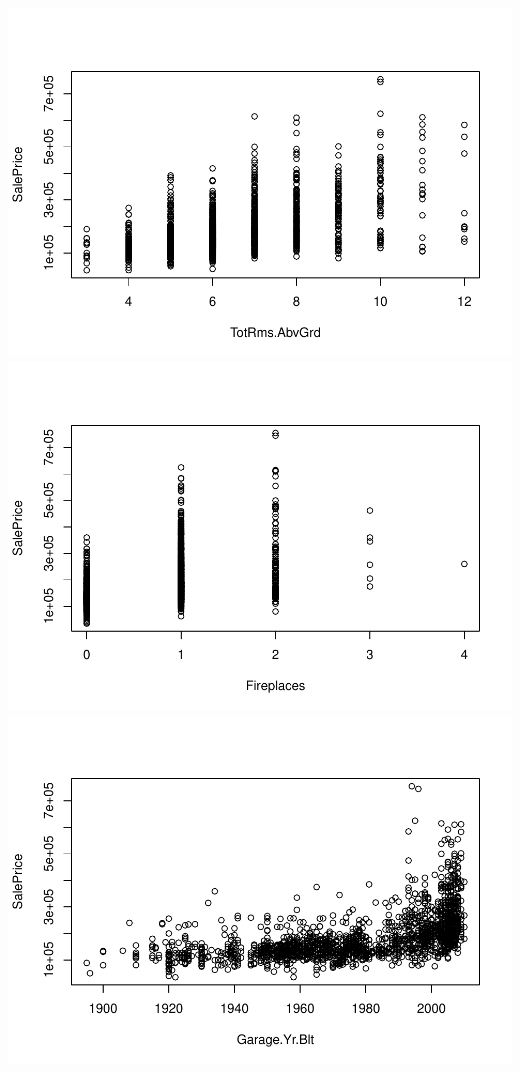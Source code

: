 \documentclass[
]{article}
\begin{document}
\includegraphics{Predicting-Housing-Price_files/figure-latex/unnamed-chunk-2-22.pdf}
\includegraphics{Predicting-Housing-Price_files/figure-latex/unnamed-chunk-2-23.pdf}
\includegraphics{Predicting-Housing-Price_files/figure-latex/unnamed-chunk-2-24.pdf}
\end{document}
